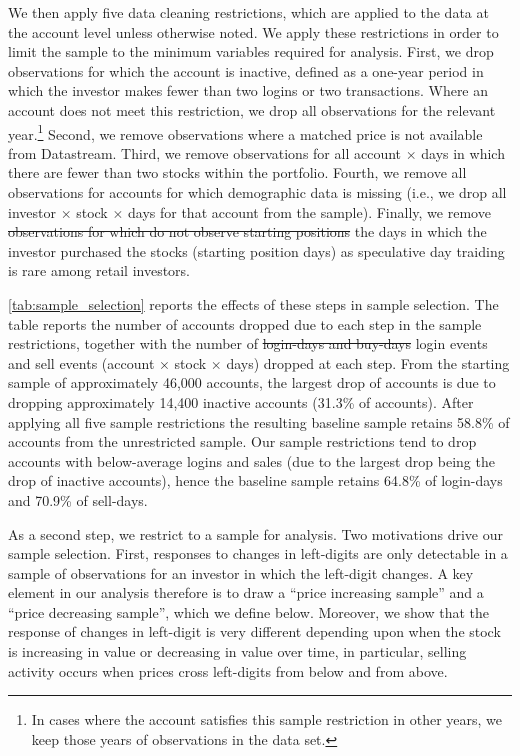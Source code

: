 We then apply five data cleaning restrictions, which are applied to the data at the account level unless otherwise noted. We apply these restrictions in order to limit the sample to the minimum variables required for analysis. First, we drop observations for which the account is inactive, defined as a one-year period in which the investor makes fewer than two logins or two transactions. Where an account does not meet this restriction, we drop all observations for the relevant year.\footnote{In cases where the account satisfies this sample restriction in other years, we keep those years of observations in the data set.} Second, we remove observations where a matched price is not available from Datastream. Third, we remove observations for all account $\times$ days in which there are fewer than two stocks within the portfolio.  Fourth, we remove all observations for accounts for which demographic data is missing (i.e., we drop all investor $\times$ stock $\times$ days for that account from the sample). Finally, we remove \st{observations for which do not observe starting positions} the days in which the investor purchased the stocks (starting position days) as speculative day traiding is rare among retail investors. 

\ref{tab:sample_selection} reports the effects of these steps in sample selection. The table reports the number of accounts dropped due to each step in the sample restrictions, together with the number of \st{login-days and buy-days} login events and sell events (account $\times$ stock $\times$ days) dropped at each step. From the starting sample of approximately 46,000 accounts, the largest drop of accounts is due to dropping approximately 14,400 inactive accounts (31.3\% of accounts). After applying all five sample restrictions the resulting baseline sample retains 58.8\% of accounts from the unrestricted sample. Our sample restrictions tend to drop accounts with below-average logins and sales (due to the largest drop being the drop of inactive accounts), hence the baseline sample retains 64.8\% of login-days and 70.9\% of sell-days. 

As a second step, we restrict to a sample for analysis. Two motivations drive our sample selection. First, responses to changes in left-digits are only detectable in a sample of observations for an investor in which the left-digit changes.  A key element in our analysis therefore is to draw a ``price increasing sample'' and a ``price decreasing sample'', which we define below. Moreover, we show that the response of changes in left-digit is very different depending upon when the stock is increasing in value or decreasing in value over time, in particular, selling activity occurs when prices cross left-digits from below and from above.

